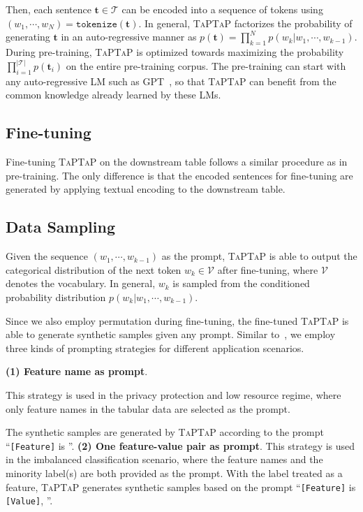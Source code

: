 Then, each sentence $\mathbf{t}\in \mathcal{T}$ can be encoded into a sequence of tokens using $(w_1,\cdots,w_N)=\mathtt{tokenize}(\mathbf{t})$.
In general, \textsc{TaPTaP} factorizes the probability of generating $\mathbf{t}$ in an auto-regressive manner as $p(\mathbf{t})=\prod_{k=1}^N p(w_k|w_1,\cdots,w_{k-1})$.
During pre-training, \textsc{TaPTaP} is optimized towards maximizing the probability $\prod_{i=1}^{|\mathcal{T}|} p(\mathbf{t}_i)$ on the entire pre-training corpus. The pre-training can start with any auto-regressive LM such as GPT~\cite{GPT2}, so that \textsc{TaPTaP} can benefit from the common knowledge already learned by these LMs.

\subsection{Fine-tuning}

Fine-tuning \textsc{TaPTaP} on the downstream table follows a similar procedure as in pre-training. The only difference is that the encoded sentences for fine-tuning are generated by applying textual encoding to the downstream table.

\subsection{Data Sampling}

Given the sequence $(w_1,\cdots,w_{k-1})$ as the prompt, \textsc{TaPTaP} is able to output the categorical distribution of the next token $w_k\in \mathcal{V}$ after fine-tuning, where $\mathcal{V}$ denotes the vocabulary. In general, $w_k$ is sampled from the conditioned probability distribution $p(w_k|w_1,\cdots,w_{k-1})$.

Since we also employ permutation during fine-tuning, the fine-tuned \textsc{TaPTaP} is able to generate synthetic samples given any prompt. Similar to~\citet{GReaT}, we employ three kinds of prompting strategies for different application scenarios.

\textbf{(1) Feature name as prompt}.

This strategy is used in the privacy protection and low resource regime, where only feature names in the tabular data are selected as the prompt.

The synthetic samples are generated by \textsc{TaPTaP} according to the prompt ``\texttt{[Feature]} is ''.
\textbf{(2) One feature-value pair as prompt}. This strategy is used in the imbalanced classification scenario, where the feature names and the minority label(s) are both provided as the prompt. With the label treated as a feature, \textsc{TaPTaP} generates synthetic samples based on the prompt ``\texttt{[Feature]} is \texttt{[Value]}, ''.

